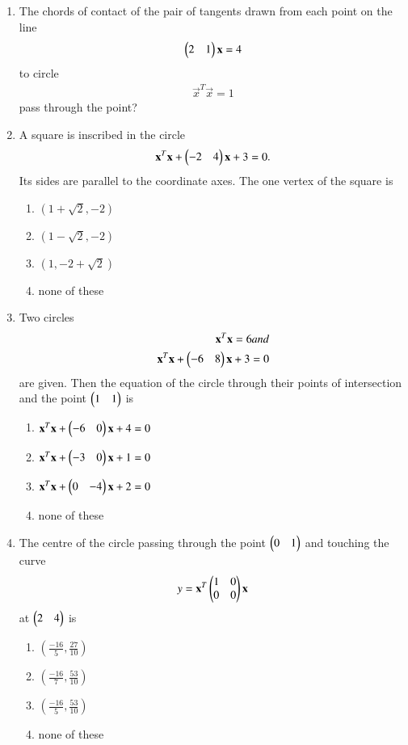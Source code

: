 \begin{enumerate}[label=\arabic*.,ref=\thesubsection.\theenumi]
\item The chords of contact of the pair of tangents drawn from each point on the line 
\begin{align}
\begin{pmatrix}2 & 1\end{pmatrix}\mathbf{x} = 4
\end{align} 
to circle 
\begin{align}
\vec{x}^T\vec{x} = 1
\end{align} 
pass through the point?

\item  A square is inscribed in the circle  
\begin{align}
\mathbf{x}^T\mathbf{x} + \begin{pmatrix}-2 & 4\end{pmatrix}\mathbf{x} + 3 = 0.
\end{align} 
Its sides are parallel to the coordinate axes. The one vertex of the square is
\begin{enumerate}
\item $(1 + \sqrt{2}, -2)$
\item $(1 - \sqrt{2}, -2)$
\item $(1, -2+\sqrt{2})$
\item none of these
\end{enumerate}

\item Two circles 
\begin{align}
\mathbf{x}^T\mathbf{x} = 6 and \\
\mathbf{x}^T\mathbf{x} + \begin{pmatrix}-6 & 8\end{pmatrix}\mathbf{x} + 3 = 0
\end{align} 
are given. Then the equation of the circle through their points of intersection and the point $\begin{pmatrix}1 & 1\end{pmatrix}$ is
\begin{enumerate}
\item $\mathbf{x}^T\mathbf{x} + \begin{pmatrix}-6 & 0\end{pmatrix}\mathbf{x} + 4 = 0$
\item $\mathbf{x}^T\mathbf{x} + \begin{pmatrix}-3 & 0\end{pmatrix}\mathbf{x} + 1 = 0$
\item $\mathbf{x}^T\mathbf{x} + \begin{pmatrix}0 & -4\end{pmatrix}\mathbf{x} + 2 = 0$
\item none of these
\end{enumerate}

\item The centre of the circle passing through the point $\begin{pmatrix}0 & 1\end{pmatrix}$ and touching the curve 
\begin{align}
y = \mathbf{x}^T\begin{pmatrix}1 & 0 \\ 0 & 0\end{pmatrix}\mathbf{x}
\end{align} 
at $\begin{pmatrix}2 & 4\end{pmatrix}$ is
\begin{enumerate}
\item $(\frac{-16}{5}, \frac{27}{10})$
\item $(\frac{-16}{7}, \frac{53}{10})$
\item $(\frac{-16}{5}, \frac{53}{10})$
\item none of these
\end{enumerate}
    

\end{enumerate}

